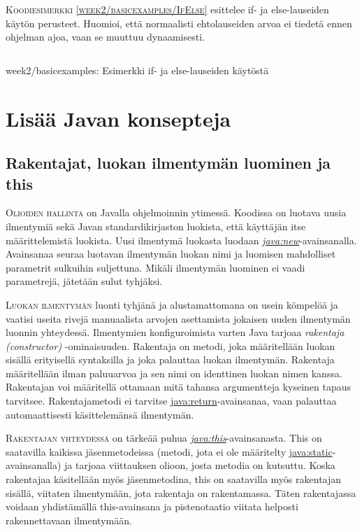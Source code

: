 \documentclass[openany]{book}
\newcommand{\newthought}[1]{\smallskip\textsc{#1}}
\newcommand{\eng}[1]{\textit{(#1)}}
\newcommand{\new}[1]{\textit{\gls{#1}}}
\newcommand{\neweng}[2]{\new{#1} \eng{#2}}
\newcommand{\java}[1]{\underline{\gls{java:#1}}}
\newcommand{\newjava}[1]{\textit{\java{#1}}}
\newcommand{\code}[3]{
	\begin{listing}
		\linespread{0.85}
		\inputminted{java}{OhjelmointiopasEsimerkit/src/#1/#2.java}
		\caption{#1: #3}
		\label{#1/#2}
	\end{listing}
}
\begin{document}
\newthought{Koodiesimerkki \ref{week2/basicexamples/IfElse}} esittelee if- ja else-lauseiden
käytön perusteet. Huomioi, että normaalisti ehtolauseiden arvoa ei tiedetä ennen ohjelman ajoa,
vaan se muuttuu dynaamisesti.

\code{week2/basicexamples}{IfElse}{Esimerkki if- ja else-lauseiden käytöstä}


\section{Lisää Javan konsepteja}
\label{ohjelman perusteista2}

\subsection{Rakentajat, luokan ilmentymän luominen ja this}
\label{new this}

\newthought{Olioiden hallinta} on Javalla ohjelmoinnin ytimessä. Koodissa on luotava uusia
ilmentymiä sekä Javan standardikirjaston luokista, että käyttäjän itse määrittelemistä luokista.
Uusi ilmentymä luokasta luodaan \newjava{new}-avainsanalla. Avainsanaa seuraa luotavan ilmentymän
luokan nimi ja luomisen mahdolliset parametrit sulkuihin suljettuna. Mikäli ilmentymän luominen
ei vaadi parametrejä, jätetään sulut tyhjäksi.

\newthought{Luokan ilmentymän} luonti tyhjänä ja alustamattomana on usein kömpelöä ja vaatisi
useita rivejä manuaalista arvojen asettamista jokaisen uuden ilmentymän luonnin yhteydessä.
Ilmentymien konfiguroimista varten Java tarjoaa \neweng{rakentaja}{constructor} -ominaisuuden.
Rakentaja on metodi, joka määritellään luokan sisällä erityisellä syntaksilla ja joka palauttaa
luokan ilmentymän. Rakentaja määritellään ilman paluuarvoa ja sen nimi on identtinen luokan nimen
kanssa. Rakentajan voi määritellä ottamaan mitä tahansa argumentteja kyseinen tapaus tarvitsee.
Rakentajametodi ei tarvitse \java{return}-avainsanaa, vaan palauttaa automaattisesti
käsittelemänsä ilmentymän.

\newthought{Rakentajan yhteydessä} on tärkeää puhua \newjava{this}-avainsanasta. This on
saatavilla kaikissa jäsenmetodeissa (metodi, jota ei ole määritelty \java{static}-avainsanalla) ja
tarjoaa viittauksen olioon, josta metodia on kutsuttu. Koska rakentajaa käsitellään myös
jäsenmetodina, this on saatavilla myös rakentajan sisällä, viitaten ilmentymään, jota rakentaja
on rakentamassa. Täten rakentajassa voidaan yhdistämällä this-avainsana ja pistenotaatio viitata
helposti rakennettavaan ilmentymään.
\end{document}
